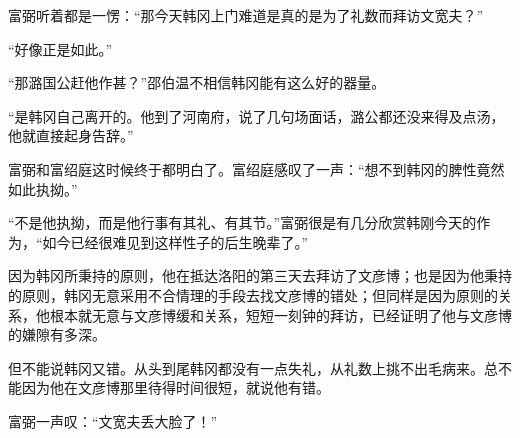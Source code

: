 富弼听着都是一愣：“那今天韩冈上门难道是真的是为了礼数而拜访文宽夫？”

“好像正是如此。”

“那潞国公赶他作甚？”邵伯温不相信韩冈能有这么好的器量。

“是韩冈自己离开的。他到了河南府，说了几句场面话，潞公都还没来得及点汤，他就直接起身告辞。”

富弼和富绍庭这时候终于都明白了。富绍庭感叹了一声：“想不到韩冈的脾性竟然如此执拗。”

“不是他执拗，而是他行事有其礼、有其节。”富弼很是有几分欣赏韩刚今天的作为，“如今已经很难见到这样性子的后生晚辈了。”

因为韩冈所秉持的原则，他在抵达洛阳的第三天去拜访了文彦博；也是因为他秉持的原则，韩冈无意采用不合情理的手段去找文彦博的错处；但同样是因为原则的关系，他根本就无意与文彦博缓和关系，短短一刻钟的拜访，已经证明了他与文彦博的嫌隙有多深。

但不能说韩冈又错。从头到尾韩冈都没有一点失礼，从礼数上挑不出毛病来。总不能因为他在文彦博那里待得时间很短，就说他有错。

富弼一声叹：“文宽夫丢大脸了！”

